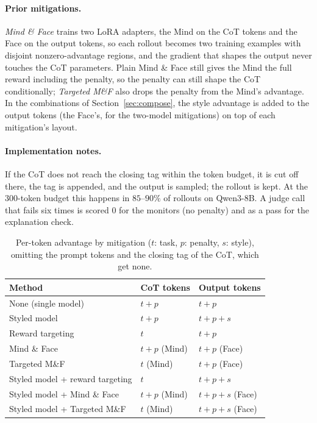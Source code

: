 \documentclass{article}
\begin{document}
\paragraph{Prior mitigations.} \emph{Mind \& Face} trains two LoRA adapters, the Mind on the CoT tokens and the Face on the output tokens, so each rollout becomes two training examples with disjoint nonzero-advantage regions, and the gradient that shapes the output never touches the CoT parameters. Plain Mind \& Face still gives the Mind the full reward including the penalty, so the penalty can still shape the CoT conditionally; \emph{Targeted M\&F} also drops the penalty from the Mind's advantage. In the combinations of Section~\ref{sec:compose}, the style advantage is added to the output tokens (the Face's, for the two-model mitigations) on top of each mitigation's layout.

\paragraph{Implementation notes.} If the CoT does not reach the closing tag within the token budget, it is cut off there, the tag is appended, and the output is sampled; the rollout is kept. At the 300-token budget this happens in $85$--$90\%$ of rollouts on Qwen3-8B. A judge call that fails six times is scored $0$ for the monitors (no penalty) and as a pass for the explanation check.

\begin{table}[h]
\centering
\caption{Per-token advantage by mitigation ($t$: task, $p$: penalty, $s$: style), omitting
the prompt tokens and the closing tag of the CoT, which get none.}
\label{tab:mitadv}
\begin{tabular}{lll}
\toprule
Method & CoT tokens & Output tokens \\
\midrule
None (single model) & $t + p$ & $t + p$ \\
Styled model & $t + p$ & $t + p + s$ \\
Reward targeting & $t$ & $t + p$ \\
Mind \& Face & $t + p$ (Mind) & $t + p$ (Face) \\
Targeted M\&F & $t$ (Mind) & $t + p$ (Face) \\
Styled model + reward targeting & $t$ & $t + p + s$ \\
Styled model + Mind \& Face & $t + p$ (Mind) & $t + p + s$ (Face) \\
Styled model + Targeted M\&F & $t$ (Mind) & $t + p + s$ (Face) \\
\bottomrule
\end{tabular}
\end{table}
\end{document}
